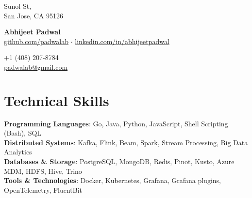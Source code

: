 \documentclass[10pt,letterpaper]{article}
\begin{document}
\noindent
\begin{minipage}[t]{0.25\textwidth}
    \small 
     Sunol St, \\
    \vspace{2pt}
    San Jose, CA 95126 
\end{minipage}
\begin{minipage}[t]{0.50\textwidth}
    \centering
    {\Huge \textbf{Abhijeet Padwal}} \\ \vspace{6pt} 
    \small 
    \href{https://github.com/padwalab}{github.com/padwalab} $\cdot$ \href{https://linkedin.com/in/abhijeetpadwal}{linkedin.com/in/abhijeetpadwal}
\end{minipage}
\begin{minipage}[t]{0.25\textwidth}
    \small 
    \flushright
    +1 (408) 207-8784 \\
    \vspace{2pt}
    \href{mailto:padwalab@gmail.com}{padwalab@gmail.com}
\end{minipage}

\vspace{10pt}

\section{Technical Skills}
\begin{itemize}[leftmargin=0.15in, label={}]
    \small{\item{
     \textbf{Programming Languages}{: Go, Java, Python, JavaScript, Shell Scripting (Bash), SQL} \\
     \textbf{Distributed Systems}{: Kafka, Flink, Beam, Spark, Stream Processing, Big Data Analytics} \\
     \textbf{Databases \& Storage}{: PostgreSQL, MongoDB, Redis, Pinot, Kusto, Azure MDM, HDFS, Hive, Trino} \\
     \textbf{Tools \& Technologies}{: Docker, Kubernetes, Grafana, Grafana plugins, OpenTelemetry, FluentBit}
    }}
\end{itemize}
\vspace{-5pt}
\end{document}
